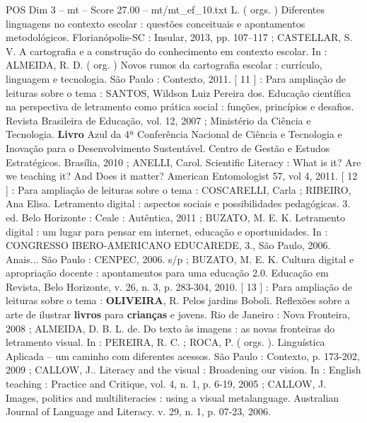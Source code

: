 \begin{textsample}{POS Dim 3 – mt – Score 27.00 – mt/mt\_ef\_10.txt}
L. ( orgs. ) Diferentes linguagens no contexto escolar : questões conceituais e apontamentos metodológicos.
Florianópolis-SC : Insular, 2013, pp. 107–117 ; CASTELLAR, S.
V.
A cartografia e a construção do conhecimento em contexto escolar.
In : ALMEIDA, R.
D. ( org. ) Novos rumos da cartografia escolar : currículo, linguagem e tecnologia.
São Paulo : Contexto, 2011. [ 11 ] : Para ampliação de leituras sobre o tema : SANTOS, Wildson Luiz Pereira dos.
Educação científica na perspectiva de letramento como prática social : funções, princípios e desafios.
Revista Brasileira de Educação, vol. 12, 2007 ; Ministério da Ciência e Tecnologia. \textbf{Livro} Azul da 4ª Conferência Nacional de Ciência e Tecnologia e Inovação para o Desenvolvimento Sustentável.
Centro de Gestão e Estudos Estratégicos.
Brasília, 2010 ; ANELLI, Carol.
Scientific Literacy : What is it?
Are we teaching it?
And Does it matter?
American Entomologist 57, vol 4, 2011. [ 12 ] : Para ampliação de leituras sobre o tema : COSCARELLI, Carla ; RIBEIRO, Ana Elisa.
Letramento digital : aspectos sociais e possibilidades pedagógicas. 3. ed.
Belo Horizonte : Ceale : Autêntica, 2011 ; BUZATO, M.
E.
K.
Letramento digital : um lugar para pensar em internet, educação e oportunidades.
In : CONGRESSO IBERO-AMERICANO EDUCAREDE, 3., São Paulo, 2006.
Anais...
São Paulo : CENPEC, 2006. s/p ; BUZATO, M.
E.
K.
Cultura digital e apropriação docente : apontamentos para uma educação 2.0.
Educação em Revista, Belo Horizonte, v. 26, n. 3, p. 283-304, 2010. [ 13 ] : Para ampliação de leituras sobre o tema : \textbf{OLIVEIRA}, R.
Pelos jardins Boboli.
Reflexões sobre a arte de ilustrar \textbf{livros} para \textbf{crianças} e jovens.
Rio de Janeiro : Nova Fronteira, 2008 ; ALMEIDA, D.
B.
L. de.
Do texto às imagens : as novas fronteiras do letramento visual.
In : PEREIRA, R.
C. ; ROCA, P. ( orgs. ).
Linguística Aplicada – um caminho com diferentes acessos.
São Paulo : Contexto, p. 173-202, 2009 ; CALLOW, J..
Literacy and the visual : Broadening our vision.
In : English teaching : Practice and Critique, vol. 4, n. 1, p. 6-19, 2005 ; CALLOW, J.
Images, politics and multiliteracies : using a visual metalanguage.
Australian Journal of Language and Literacy. v. 29, n. 1, p. 07-23, 2006.

\end{textsample}
